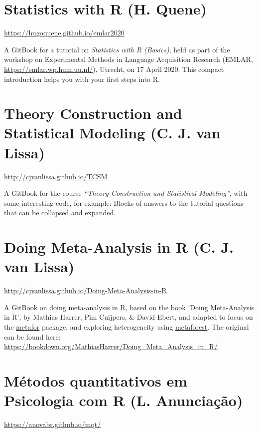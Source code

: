 \documentclass[
]{book}
\begin{document}
\section{Statistics with R (H. Quene)}\label{statistics-with-r-h.-quene}

\url{https://hugoquene.github.io/emlar2020}

A GitBook for a tutorial on \emph{Statistics with R (Basics)}, held as part of the workshop on Experimental Methods in Language Acquisition Research (EMLAR, \url{https://emlar.wp.hum.uu.nl/}), Utrecht, on 17 April 2020. This compact introduction helps you with your first steps into R.

\section{Theory Construction and Statistical Modeling (C. J. van Lissa)}\label{theory-construction-and-statistical-modeling-c.-j.-van-lissa}

\url{http://cjvanlissa.github.io/TCSM}

A GitBook for the course \emph{``Theory Construction and Statistical Modeling''}, with some interesting code, for example: Blocks of answers to the tutorial questions that can be collapsed and expanded.

\section{Doing Meta-Analysis in R (C. J. van Lissa)}\label{doing-meta-analysis-in-r-c.-j.-van-lissa}

\url{http://cjvanlissa.github.io/Doing-Meta-Analysis-in-R}

A GitBook on doing meta-analysis in R, based on the book `Doing Meta-Analysis in R', by Mathias Harrer, Pim Cuijpers, \& David Ebert, and adapted to focus on the \href{https://cran.r-project.org/web/packages/metafor/index.html}{metafor} package, and exploring heterogeneity using \href{https://cran.r-project.org/web/packages/metaforest/index.html}{metaforest}. The original can be found here: \url{https://bookdown.org/MathiasHarrer/Doing_Meta_Analysis_in_R/}

\section{Métodos quantitativos em Psicologia com R (L. Anunciação)}\label{muxe9todos-quantitativos-em-psicologia-com-r-l.-anunciauxe7uxe3o}

\url{https://anovabr.github.io/mqt/}
\end{document}
